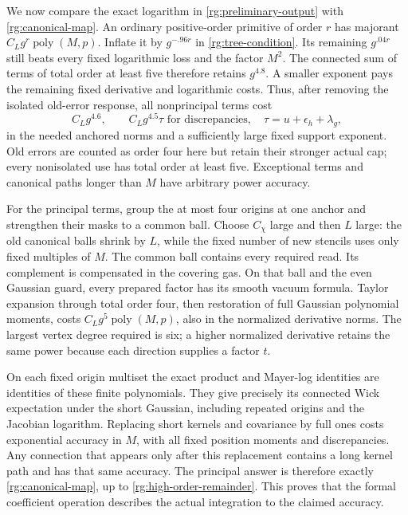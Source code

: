We now compare the exact logarithm in
\eqref{rg:preliminary-output} with \eqref{rg:canonical-map}.
An ordinary positive-order primitive of order $r$ has majorant
$C_Lg^r\operatorname{poly}(M,p)$.  Inflate it by $g^{-.96r}$ in
\eqref{rg:tree-condition}.  Its remaining $g^{.04r}$ still beats
every fixed logarithmic loss and the factor $M^2$.  The connected
sum of terms of total order at least five therefore retains
$g^{4.8}$.  A smaller exponent pays the remaining fixed derivative
and logarithmic costs.  Thus, after removing the isolated old-error
response, all nonprincipal terms cost
\begin{equation}
 C_Lg^{4.6},\qquad C_Lg^{4.5}\tau\text{ for discrepancies},
 \quad \tau=u+\epsilon_h+\lambda_g,
 \label{rg:high-order-remainder}
\end{equation}
in the needed anchored norms and a sufficiently large fixed support
exponent.  Old errors are counted as order four here but retain
their stronger actual cap; every nonisolated use has total order
at least five.  Exceptional terms and canonical paths longer than
$M$ have arbitrary power accuracy.

For the principal terms, group the at most four origins at one
anchor and strengthen their masks to a common ball.  Choose
$C_\chi$ large and then $L$ large: the old canonical balls shrink
by $L$, while the fixed number of new stencils uses only fixed
multiples of $M$.  The common ball contains every required read.
Its complement is compensated in the covering gas.  On that ball
and the even Gaussian guard, every prepared factor has its smooth
vacuum formula.  Taylor expansion through total order four, then
restoration of full Gaussian polynomial moments, costs
$C_Lg^5\operatorname{poly}(M,p)$, also in the normalized derivative
norms.  The largest vertex degree required is six; a higher
normalized derivative retains the same power because each
direction supplies a factor $t$.

On each fixed origin multiset the exact product and Mayer-log
identities are identities of these finite polynomials.  They give
precisely its connected Wick expectation under the short Gaussian,
including repeated origins and the Jacobian logarithm.  Replacing
short kernels and covariance by full ones costs exponential
accuracy in $M$, with all fixed position moments and discrepancies.
Any connection that appears only after this replacement contains
a long kernel path and has that same accuracy.  The principal
answer is therefore exactly \eqref{rg:canonical-map}, up to
\eqref{rg:high-order-remainder}.  This proves that the formal
coefficient operation describes the actual integration to the
claimed accuracy.

